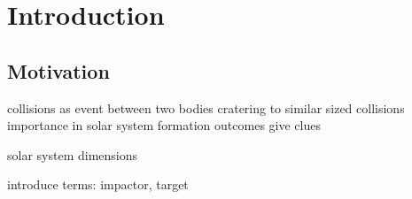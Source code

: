 \chapter{Introduction}

\section{Motivation}
collisions as event between two bodies
cratering to similar sized collisions
importance in solar system formation
outcomes give clues 

solar system dimensions

introduce terms: impactor, target


\citep{Asphaug:2010p3539}
\citep{Melosh:1989p996}




